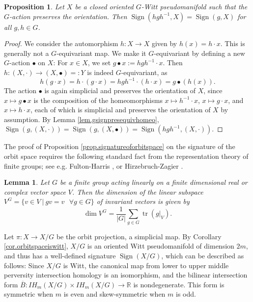 \documentclass{amsart}
\newtheorem{lemma}[thm]{Lemma}
\newtheorem{prop}[thm]{Proposition}
\theoremstyle{definition}
\theoremstyle{remark}
\newcommand {\real}  {\ensuremath{\mathbb{R}}}
\newcommand {\Sign}    {{\ensuremath{\operatorname{Sign}}}}
\newcommand {\tr}    {{\ensuremath{\operatorname{tr}}}}
\begin{document}
\begin{prop} \label{prop.equivsignconjugation}
Let $X$ be a closed oriented $G$-Witt pseudomanifold such that the $G$-action
preserves the orientation. Then
$\Sign (hgh^{-1}, X) =  \Sign (g, X)$
for all $g,h\in G$.
\end{prop}
\begin{proof}
We consider the automorphism $h: X \to X$ given by $h(x) = h\cdot x$.
This is generally not a $G$-equivariant map.
We make it $G$-equivariant by defining a new $G$-action 
$\bullet$ on $X$: 
For $x\in X$, we set $g\bullet x := hgh^{-1} \cdot x$.
Then $h: (X,\cdot) \to (X,\bullet)=:Y$ is indeed $G$-equivariant, as
\[ h (g\cdot x) = h\cdot (g \cdot x)
= hgh^{-1} \cdot (h\cdot x) = g\bullet (h(x)). \]
The action $\bullet$ is again simplicial and preserves the orientation of $X$,
since $x \mapsto g\bullet x$ is the composition of the 
homeomorphisms 
$x \mapsto h^{-1} \cdot x$,
$x \mapsto g\cdot x$, and
$x \mapsto h\cdot x$,
each of which is simplicial and preserves the orientation of $X$ by assumption.
By Lemma \ref{lem.gsignpresequivhomeo},
$\Sign (g, (X,\cdot)) = \Sign (g, (X,\bullet)) = \Sign (hgh^{-1}, (X,\cdot))$.
\end{proof}

The proof of Proposition \ref{prop.signatureoforbitspace}  on the signature of
the orbit space requires 
the following standard fact from the representation theory of finite groups;
see e.g. Fulton-Harris \cite[p. 15f]{fultonharris},
or Hirzebruch-Zagier \cite[Thm. p. 21f]{hirzebruchzagier}.
\begin{lemma} \label{lem.reptheoryfingroups}
Let $G$ be a finite group acting linearly on a 
finite dimensional real or complex vector space $V$.
Then the dimension of the linear subspace 
$V^G = \{ v\in V ~|~ gv=v \text{ } \forall g\in G \}$ of invariant vectors
is given by
\[ \dim V^G = \frac{1}{|G|} \sum_{g\in G} \tr (g|_V). \]
\end{lemma}

Let $\pi: X \to X/G$ be the orbit projection, a simplicial map.
By Corollary \ref{cor.orbitspaceiswitt}, $X/G$ is an oriented Witt pseudomanifold 
of dimension $2m$,
and thus has a well-defined signature $\Sign (X/G)$, which can be described
as follows:
Since $X/G$ is Witt,
the canonical map from lower to upper middle perversity intersection 
homology is an isomorphism, and the bilinear intersection form
$\overline{B}: IH_m (X/G) \times IH_m (X/G) \to \real$
is nondegenerate. This form is symmetric when $m$ is even and
skew-symmetric when $m$ is odd. 
\end{document}
